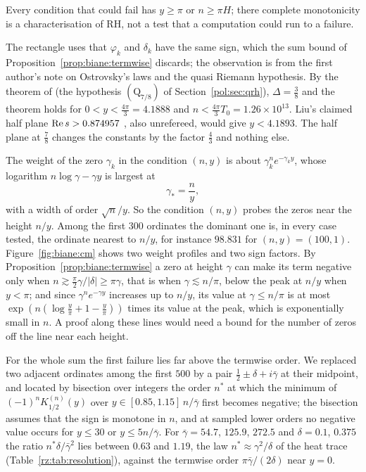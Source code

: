 Every condition that could fail has $y\ge\pi$ or $n\ge\pi H$; there complete monotonicity is a characterisation of RH, not a test that a computation could run to a failure.

\begin{remark}\label{tx3:rem:qrhrange}
The rectangle uses that $\varphi_k$ and $\delta_k$ have the same sign, which the sum bound of Proposition~\ref{prop:biane:termwise} discards; the observation is from the first author's note on Ostrovsky's laws and the quasi Riemann hypothesis. By the theorem of \cite{OAI26a} (the hypothesis $(\mathrm Q_{7/8})$ of Section~\ref{pol:sec:qrh}), $\Delta=\frac38$ and the theorem holds for $0<y<\frac{4\pi}3=4.1888$ and $n<\frac{4\pi}3T_0=1.26\times10^{13}$. Liu's claimed half plane $\operatorname{Re} s>0.874957$ \cite{Liu26a}, also unrefereed, would give $y<4.1893$. The half plane at $\frac78$ changes the constants by the factor $\frac43$ and nothing else.
\end{remark}

The weight of the zero $\gamma_k$ in the condition $(n,y)$ is about $\gamma_k^ne^{-\gamma_ky}$, whose logarithm $n\log\gamma-\gamma y$ is largest at
\[
\gamma_*=\frac ny,
\]
with a width of order $\sqrt n/y$. So the condition $(n,y)$ probes the zeros near the height $n/y$. Among the first $300$ ordinates the dominant one is, in every case tested, the ordinate nearest to $n/y$, for instance $98.831$ for $(n,y)=(100,1)$. Figure~\ref{fig:biane:cm} shows two weight profiles and two sign factors. By Proposition~\ref{prop:biane:termwise} a zero at height $\gamma$ can make its term negative only when $n\gtrsim\frac\pi2\gamma/|\delta|\ge\pi\gamma$, that is when $\gamma\lesssim n/\pi$, below the peak at $n/y$ when $y<\pi$; and since $\gamma^ne^{-\gamma y}$ increases up to $n/y$, its value at $\gamma\le n/\pi$ is at most $\exp(n(\log\frac y\pi+1-\frac y\pi))$ times its value at the peak, which is exponentially small in $n$. A proof along these lines would need a bound for the number of zeros off the line near each height.

For the whole sum the first failure lies far above the termwise order. We replaced two adjacent ordinates among the first $500$ by a pair $\frac12\pm\delta+i\bar\gamma$ at their midpoint, and located by bisection over integers the order $n^*$ at which the minimum of $(-1)^nK_{1/2}^{(n)}(y)$ over $y\in[0.85,1.15]\,n/\bar\gamma$ first becomes negative; the bisection assumes that the sign is monotone in $n$, and at sampled lower orders no negative value occurs for $y\le30$ or $y\le5n/\bar\gamma$. For $\bar\gamma=54.7$, $125.9$, $272.5$ and $\delta=0.1$, $0.375$ the ratio $n^*\delta/\bar\gamma^2$ lies between $0.63$ and $1.19$, the law $n^*\approx\gamma^2/\delta$ of the heat trace (Table~\ref{rz:tab:resolution}), against the termwise order $\pi\bar\gamma/(2\delta)$ near $y=0$.

